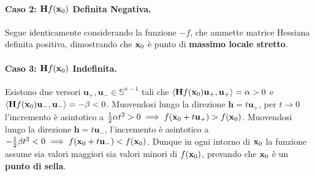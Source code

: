 \begin{dimostrazione}
\paragraph{Caso 2: $\mathbf{H} f(\mathbf{x}_0)$ Definita Negativa.}
Segue identicamente considerando la funzione $-f$, che ammette matrice Hessiana definita positiva, dimostrando che $\mathbf{x}_0$ è punto di \textbf{massimo locale stretto}.

\paragraph{Caso 3: $\mathbf{H} f(\mathbf{x}_0)$ Indefinita.}
Esistono due versori $\mathbf{u}_+, \mathbf{u}_- \in \mathbb{S}^{n-1}$ tali che $\langle\mathbf{H} f(\mathbf{x}_0)\mathbf{u}_+, \mathbf{u}_+\rangle = \alpha > 0$ e $\langle\mathbf{H} f(\mathbf{x}_0)\mathbf{u}_-, \mathbf{u}_-\rangle = -\beta < 0$.
Muovendosi lungo la direzione $\mathbf{h} = t \mathbf{u}_+$, per $t \to 0$ l'incremento è asintotico a $\frac{1}{2}\alpha t^2 > 0 \implies f(\mathbf{x}_0+t\mathbf{u}_+) > f(\mathbf{x}_0)$.
Muovendosi lungo la direzione $\mathbf{h} = t \mathbf{u}_-$, l'incremento è asintotico a $-\frac{1}{2}\beta t^2 < 0 \implies f(\mathbf{x}_0+t\mathbf{u}_-) < f(\mathbf{x}_0)$.
Dunque in ogni intorno di $\mathbf{x}_0$ la funzione assume sia valori maggiori sia valori minori di $f(\mathbf{x}_0)$, provando che $\mathbf{x}_0$ è un \textbf{punto di sella}.
\end{dimostrazione}

